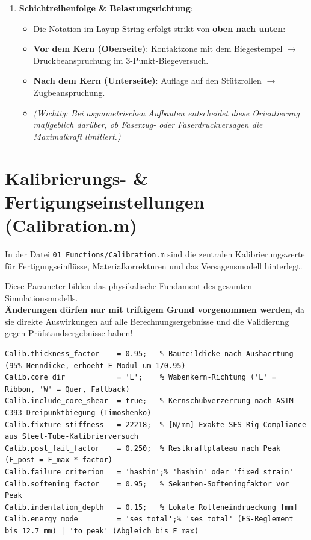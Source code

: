 \begin{enumerate}
    \item \textbf{Schichtreihenfolge \& Belastungsrichtung}:
    \begin{itemize}
        \item Die Notation im Layup-String erfolgt strikt von \textbf{oben nach unten}:
        \item \textbf{Vor dem Kern (Oberseite)}: Kontaktzone mit dem Biegestempel $\to$ Druckbeanspruchung im 3-Punkt-Biegeversuch.
        \item \textbf{Nach dem Kern (Unterseite)}: Auflage auf den Stützrollen $\to$ Zugbeanspruchung.
        \item \textit{(Wichtig: Bei asymmetrischen Aufbauten entscheidet diese Orientierung maßgeblich darüber, ob Faserzug- oder Faserdruckversagen die Maximalkraft limitiert.)}
    \end{itemize}
\end{enumerate}

\clearpage

\section{Kalibrierungs- \& Fertigungseinstellungen (Calibration.m)} \label{sec:calibration}

In der Datei \texttt{01\_Functions/Calibration.m} sind die zentralen Kalibrierungswerte für Fertigungseinflüsse, Materialkorrekturen und das Versagensmodell hinterlegt.

\begin{tcolorbox}[colback=warnbg,colframe=warnred,arc=2mm,title=\textbf{ACHTUNG: Zentrale Modellparameter}]
Diese Parameter bilden das physikalische Fundament des gesamten Simulationsmodells. \\
\textbf{Änderungen dürfen nur mit triftigem Grund vorgenommen werden}, da sie direkte Auswirkungen auf alle Berechnungsergebnisse und die Validierung gegen Prüfstandsergebnisse haben!
\end{tcolorbox}

\begin{lstlisting}[style=vscodeLightMatlab]
% Auszug aus 01_Functions/Calibration.m:
Calib.thickness_factor    = 0.95;   % Bauteildicke nach Aushaertung (95% Nenndicke, erhoeht E-Modul um 1/0.95)
Calib.core_dir            = 'L';    % Wabenkern-Richtung ('L' = Ribbon, 'W' = Quer, Fallback)
Calib.include_core_shear  = true;   % Kernschubverzerrung nach ASTM C393 Dreipunktbiegung (Timoshenko)
Calib.fixture_stiffness   = 22218;  % [N/mm] Exakte SES Rig Compliance aus Steel-Tube-Kalibrierversuch
Calib.post_fail_factor    = 0.250;  % Restkraftplateau nach Peak (F_post = F_max * factor)
Calib.failure_criterion   = 'hashin';% 'hashin' oder 'fixed_strain'
Calib.softening_factor    = 0.95;   % Sekanten-Softeningfaktor vor Peak
Calib.indentation_depth   = 0.15;   % Lokale Rolleneindrueckung [mm]
Calib.energy_mode         = 'ses_total';% 'ses_total' (FS-Reglement bis 12.7 mm) | 'to_peak' (Abgleich bis F_max)
\end{lstlisting}

